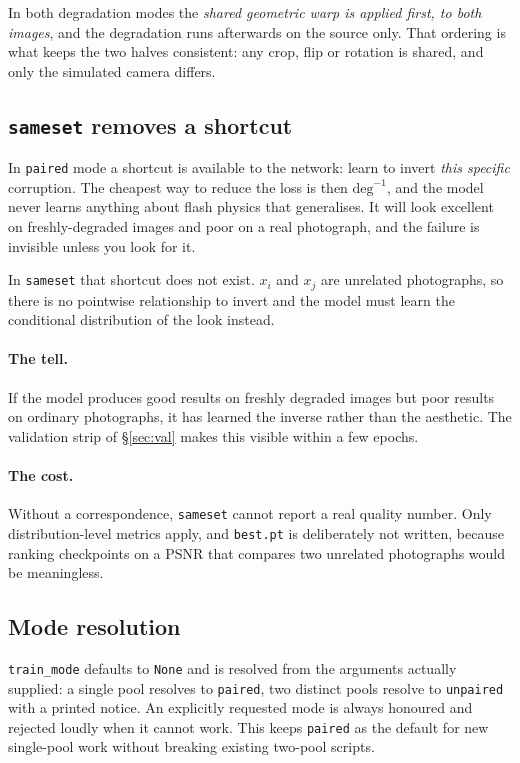 \documentclass[11pt,a4paper]{article}
\newcommand{\code}[1]{\texttt{#1}}
\begin{document}
In both degradation modes the \emph{shared geometric warp is applied first, to
both images}, and the degradation runs afterwards on the source only. That
ordering is what keeps the two halves consistent: any crop, flip or rotation is
shared, and only the simulated camera differs.

\subsection{\texorpdfstring{\code{sameset}}{sameset} removes a shortcut}
\label{sec:inverse}

In \code{paired} mode a shortcut is available to the network: learn to invert
\emph{this specific} corruption. The cheapest way to reduce the loss is then
$\mathrm{deg}^{-1}$, and the model never learns anything about flash physics that
generalises. It will look excellent on freshly-degraded images and poor on a real
photograph, and the failure is invisible unless you look for it.

In \code{sameset} that shortcut does not exist. $x_i$ and $x_j$ are unrelated
photographs, so there is no pointwise relationship to invert and the model must
learn the conditional distribution of the look instead.

\paragraph{The tell.} If the model produces good results on freshly degraded
images but poor results on ordinary photographs, it has learned the inverse rather
than the aesthetic. The validation strip of \S\ref{sec:val} makes this visible
within a few epochs.

\paragraph{The cost.} Without a correspondence, \code{sameset} cannot report a
real quality number. Only distribution-level metrics apply, and \code{best.pt} is
deliberately not written, because ranking checkpoints on a PSNR that compares two
unrelated photographs would be meaningless.

\subsection{Mode resolution}

\code{train\_mode} defaults to \code{None} and is resolved from the arguments
actually supplied: a single pool resolves to \code{paired}, two distinct pools
resolve to \code{unpaired} with a printed notice. An explicitly requested mode is
always honoured and rejected loudly when it cannot work. This keeps
\code{paired} as the default for new single-pool work without breaking existing
two-pool scripts.
\end{document}
